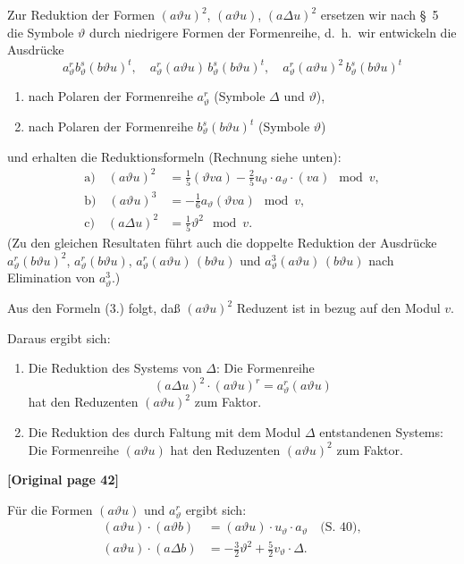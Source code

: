 \documentclass[12pt,a4paper]{article}
\begin{document}
Zur Reduktion der Formen $(a\vartheta u)^2$, $(a\vartheta u)$, $(a\varDelta u)^2$ ersetzen wir nach \S\ 5 die Symbole $\vartheta$ durch niedrigere Formen der Formenreihe, d.\ h.\ wir entwickeln die Ausdrücke
\[a_\vartheta^r b_\vartheta^s (b\vartheta u)^t, \quad a_\vartheta^r (a\vartheta u) \, b_\vartheta^s (b\vartheta u)^t, \quad a_\vartheta^r (a\vartheta u)^2 \, b_\vartheta^s (b\vartheta u)^t\]
\begin{enumerate}
\item nach Polaren der Formenreihe $a_\vartheta^r$ (Symbole $\varDelta$ und $\vartheta$),
\item nach Polaren der Formenreihe $b_\vartheta^s (b\vartheta u)^t$ (Symbole $\vartheta$)
\end{enumerate}
und erhalten die Reduktionsformeln (Rechnung siehe unten):
\begin{equation}\tag{3.}
\begin{aligned}
\text{a)} \quad (a\vartheta u)^2 &= \tfrac{1}{5}(\vartheta va) - \tfrac{2}{5}u_\vartheta \cdot a_\vartheta \cdot (va) \mod v,\\
\text{b)} \quad (a\vartheta u)^3 &= -\tfrac{1}{6}a_\vartheta (\vartheta va) \mod v,\\
\text{c)} \quad (a\varDelta u)^2 &= \tfrac{1}{5}\vartheta^2 \mod v.
\end{aligned}
\end{equation}
(Zu den gleichen Resultaten führt auch die doppelte Reduktion der Ausdrücke $a_\vartheta^r (b\vartheta u)^2$, $a_\vartheta^r (b\vartheta u)$, $a_\vartheta^r (a\vartheta u) \, (b\vartheta u)$ und $a_\vartheta^3 (a\vartheta u) \, (b\vartheta u)$ nach Elimination von $a_\vartheta^3$.)

Aus den Formeln (3.) folgt, daß $(a\vartheta u)^2$ Reduzent ist in bezug auf den Modul $v$.

Daraus ergibt sich:
\begin{enumerate}
\item[1)] Die Reduktion des Systems von $\varDelta$: Die Formenreihe
\[(a\varDelta u)^2 \cdot (a\vartheta u)^r = a_\vartheta^r (a\vartheta u)\]
hat den Reduzenten $(a\vartheta u)^2$ zum Faktor.
\item[2)] Die Reduktion des durch Faltung mit dem Modul $\varDelta$ entstandenen Systems:
Die Formenreihe $(a\vartheta u)$ hat den Reduzenten $(a\vartheta u)^2$ zum Faktor.
\end{enumerate}

\noindent\textbf{[Original page 42]}

Für die Formen $(a\vartheta u)$ und $a_\vartheta^r$ ergibt sich:
\begin{align*}
(a\vartheta u) \cdot (a\vartheta b) &= (a\vartheta u) \cdot u_\vartheta \cdot a_\vartheta \quad\text{(S.\ 40)},\\
(a\vartheta u) \cdot (a\varDelta b) &= -\tfrac{3}{2}\vartheta^2 + \tfrac{5}{2}v_\vartheta \cdot \varDelta.
\end{align*}
\end{document}
